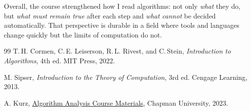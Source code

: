 \documentclass{article}
\theoremstyle{theorem}
\theoremstyle{definition}
\theoremstyle{remark}
\begin{document}
Overall, the course strengthened how I read algorithms: not only \emph{what} they do, but \emph{what must remain true} after each step and \emph{what cannot} be decided automatically. That perspective is durable in a field where tools and languages change quickly but the limits of computation do not.

\begin{thebibliography}{99}
T.\,H. Cormen, C.\,E. Leiserson, R.\,L. Rivest, and C.\,Stein,
\emph{Introduction to Algorithms}, 4th ed.
MIT Press, 2022.

M. Sipser,
\emph{Introduction to the Theory of Computation}, 3rd ed.
Cengage Learning, 2013.

A. Kurz,
\href{https://github.com/alexhkurz/algorithm-analysis-2023}{Algorithm Analysis Course Materials},
Chapman University, 2023.
\end{thebibliography}
\end{document}
